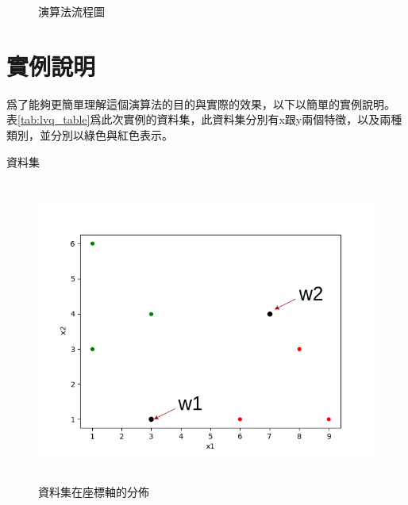 \begin{figure}
	\centering
	
	\caption{演算法流程圖}
	\label{fig:alogrithm_workflow}
\end{figure}

\section{實例說明}

爲了能夠更簡單理解這個演算法的目的與實際的效果，以下以簡單的實例說明。
表\ref{tab:lvq_table}爲此次實例的資料集，此資料集分別有x跟y兩個特徵，以及兩種類別，並分別以綠色與紅色表示。


\begin{table}[h!]
	\centering
	\caption{資料集}
	\label{tab:lvq_table}
	
\end{table}


\begin{figure}[h!]
	\centering
	\includegraphics[height=10cm]{./pic/2nSRVeud.png}
	\caption{資料集在座標軸的分佈}
	\label{fig:dataset_in_axis}
\end{figure}

